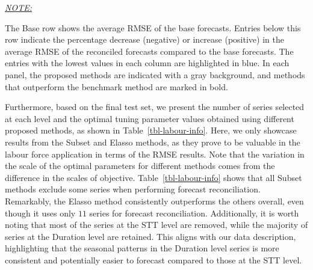 \documentclass[
  12pt,
  11pt]{article}
\begin{document}
\begin{table}[!h]
{\begin{threeparttable}
\begin{tabular}{lrrrrrrrrrrrrrrrrrrrr}
\bottomrule
\end{tabular}
\begin{tablenotes}[para]
\item \underline{\textit{NOTE:}} 
\item The Base row shows the average RMSE of the base forecasts. Entries below this row indicate the percentage decrease (negative) or increase (positive) in the average RMSE of the reconciled forecasts compared to the base forecasts. The entries with the lowest values in each column are highlighted in blue. In each panel, the proposed methods are indicated with a gray background, and methods that outperform the benchmark method are marked in bold.
\end{tablenotes}
\end{threeparttable}}
\end{table}

Furthermore, based on the final test set, we present the number of
series selected at each level and the optimal tuning parameter values
obtained using different proposed methods, as shown in
Table~\ref{tbl-labour-info}. Here, we only showcase results from the
Subset and Elasso methods, as they prove to be valuable in the labour
force application in terms of the RMSE results. Note that the variation
in the scale of the optimal parameters for different methods comes from
the difference in the scales of objective. Table~\ref{tbl-labour-info}
shows that all Subset methods exclude some series when performing
forecast reconciliation. Remarkably, the Elasso method consistently
outperforms the others overall, even though it uses only \(11\) series
for forecast reconciliation. Additionally, it is worth noting that most
of the series at the STT level are removed, while the majority of series
at the Duration level are retained. This aligns with our data
description, highlighting that the seasonal patterns in the Duration
level series is more consistent and potentially easier to forecast
compared to those at the STT level.
\end{document}
